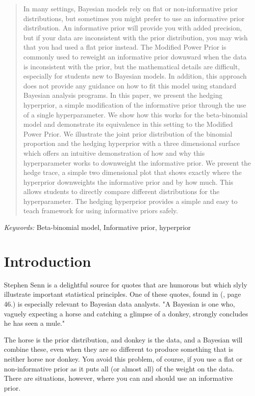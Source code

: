 \documentclass[12pt]{article}
\begin{document}
\bigskip
\begin{abstract}
In many settings, Bayesian models rely on flat or non-informative prior distributions, but sometimes you might prefer to use an informative prior distribution. An informative prior will provide you with added precision, but if your data are inconsistent with the prior distribution, you may wish that you had used a flat prior instead. The Modified Power Prior is commonly used to reweight an informative prior downward when the data is inconsistent with the prior, but the mathematical details are difficult, especially for students new to Bayesian models. In addition, this approach does not provide any guidance on how to fit this model using standard Bayesian analysis programs. In this paper, we present the hedging hyperprior, a simple modification of the informative prior through the use of a single hyperparameter. We show how this works for the beta-binomial model and demonstrate its equivalence in this setting to the Modified Power Prior. We illustrate the joint prior distribution of the binomial proportion and the hedging hyperprior with a three dimensional surface which offers an intuitive demonstration of how and why this hyperparameter works to downweight the informative prior. We present the hedge trace, a simple two dimensional plot that shows exactly where the hyperprior downweights the informative prior and by how much. This allows students to directly compare different distributions for the hyperparameter. The hedging hyperprior provides a simple and easy to teach framework for using informative priors safely.


\end{abstract}

\noindent%
{\it Keywords:}  Beta-binomial model, Informative prior, hyperprior
\vfill

\newpage
{} %
\section{Introduction}
\label{sec:intro}

Stephen Senn is a delightful source for quotes that are humorous but which slyly illustrate important statistical principles. One of these quotes, found in (\cite{senn08}, page 46.) is especially relevant to Bayesian data analysts. "A Bayesian is one who, vaguely expecting a horse and catching a glimpse of a donkey, strongly concludes he has seen a mule." 

The horse is the prior distribution, and donkey is the data, and a Bayesian will combine these, even when they are so different to produce something that is neither horse nor donkey. You avoid this problem, of course, if you use a flat or non-informative prior as it puts all (or almost all) of the weight on the data. There are situations, however, where you can and should use an informative prior.
\end{document}
